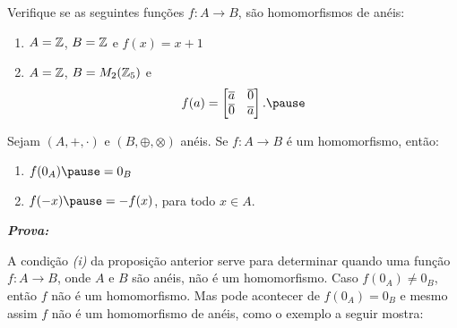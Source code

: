 \documentclass{beamer}
\begin{document}
    \begin{frame}
        \begin{exemplos}
            \begin{exemplos}
            Verifique se as seguintes funções $f : A \to B$, \pause são homomorfismos de anéis:\pause
            \begin{enumerate}[label={\roman*})]
                \item $A = \mathbb{Z}$, \pause $B = \mathbb{Z}$ \pause e $f(x) = x + 1$\pause
                \item $A = \mathbb{Z}$, \pause $B = M_2(\mathbb{Z}_5)$ \pause e
                \[
                    f(a) = \begin{bmatrix}
                        \overline{a} & \overline{0}\\
                        \overline{0} & \overline{a}
                    \end{bmatrix}.\pause
                \]
            \end{enumerate}
        \end{exemplos}
        \end{exemplos}
    \end{frame}
    \begin{frame}
        \begin{proposicao}
            Sejam $(A, +, \cdot)$ e $(B, \oplus, \otimes)$ an\'eis. \pause Se $f : A \to B$ é um homomorfismo, \pause ent{\~a}o:\pause
            \begin{enumerate}[label={\roman*})]
                \item $f(0_{A}) \pause = 0_{B}$\pause

                \vspace{.5cm}

                \item $f(-x) \pause = -f(x)$, \pause para todo $x \in A$.\pause
            \end{enumerate}
        \end{proposicao}

        \noindent \textbf{\textit{Prova: }}
    \end{frame}

    \begin{frame}
        \begin{observacao}
            A condição \textit{(i)} da proposição anterior \pause serve para determinar quando uma função $f : A \to B$, \pause onde $A$ e $B$ são anéis, não é um homomorfismo. \pause Caso $f(0_A) \ne 0_B$, \pause então $f$ não é um homomorfismo. \pause Mas pode acontecer de $f(0_A) = 0_B$ \pause e mesmo assim $f$ não é um homomorfismo de anéis, \pause como o exemplo a seguir mostra:\pause
        \end{observacao}
    \end{frame}
\end{document}
